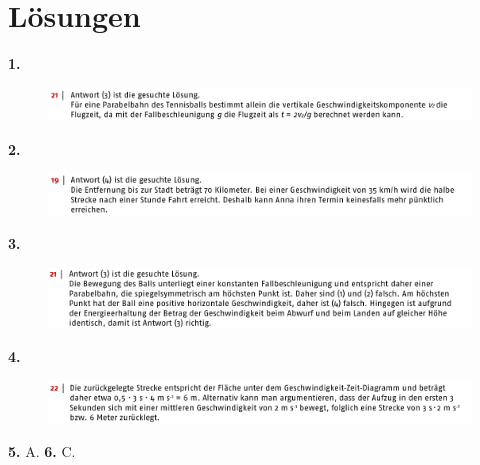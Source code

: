 \documentclass[11pt]{article}
\begin{document}
\section{Lösungen}
\textbf{1.} 
\begin{figure}[H]
    \centering
        \includegraphics[width=\textwidth]{aufgabe-1-l.png}
\end{figure} 
\noindent\textbf{2.} 
\begin{figure}[H]
    \centering
        \includegraphics[width=\textwidth]{aufgabe-2-l.png}
\end{figure} 
\noindent\textbf{3.} 
\begin{figure}[H]
    \centering
        \includegraphics[width=\textwidth]{aufgabe-3-l.png}
\end{figure} 
\noindent\textbf{4.} 
\begin{figure}[H]
    \centering
        \includegraphics[width=\textwidth]{aufgabe-4-l.png}
\end{figure} 
\noindent\textbf{5.} A.
\noindent\textbf{6.} C.
\end{document}
